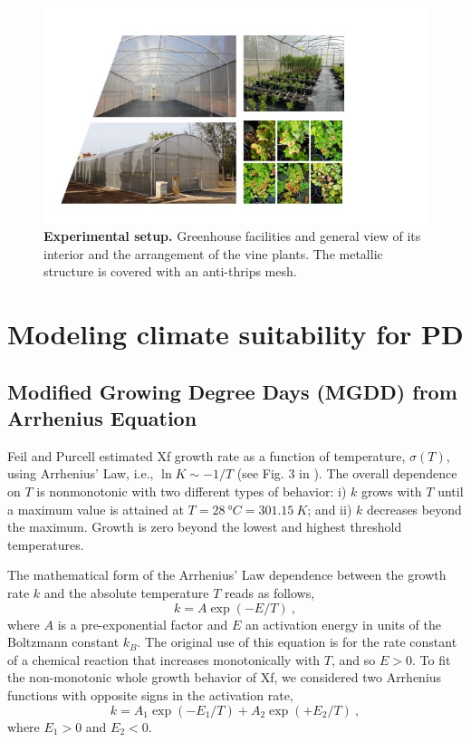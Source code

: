 \begin{figure}[H]
    \centering
    \includegraphics[width=\textwidth]{Figures/Experimental setup.jpg}
    \caption[Experimental setup]{\textbf{Experimental setup.} Greenhouse
        facilities and general
        view of its interior and the arrangement of the vine plants. The
        metallic
        structure is covered with an anti-thrips mesh.}
    \label{fig:experimental_setup} %
\end{figure}

\section{Modeling climate suitability for PD}\label{app:S2}
\subsection{Modified Growing Degree Days (MGDD) from Arrhenius
    Equation}\label{app:MGDD} %

Feil and Purcell estimated Xf growth rate as a function of temperature,
$\sigma(T)$, using Arrhenius’ Law, i.e., $\ln K \sim -1/T$ (see Fig. 3 in
\cite{Feil2001}). The overall dependence on $T$ is nonmonotonic with two
different types of behavior: i) $k$ grows with $T$ until a maximum value is
attained at $T=\SI{28}{\degree C}=\SI{301.15}{K}$; and ii) $k$ decreases beyond
the maximum. Growth is zero beyond the lowest and highest threshold
temperatures.

The mathematical form of the Arrhenius' Law dependence between the growth
rate $k$ and the absolute temperature $T$ reads as follows,
\begin{equation}
    k = A \exp(-E/T) \ ,
\end{equation}
where $A$ is a pre-exponential factor and $E$ an activation energy in units
of the Boltzmann constant $k_B$. The original use of this equation is for the
rate constant of a chemical reaction that increases monotonically with $T$, and
so $E>0$.  To fit the non-monotonic whole growth behavior of Xf, we considered
two Arrhenius functions with opposite signs in the activation rate,
\begin{equation}\label{eq: Arrhenius_2}
    k =A_1 \exp(-E_1/T) + A_2 \exp(+E_2/T) \ ,
\end{equation}
where $E_1>0$ and $E_2<0$.\\

